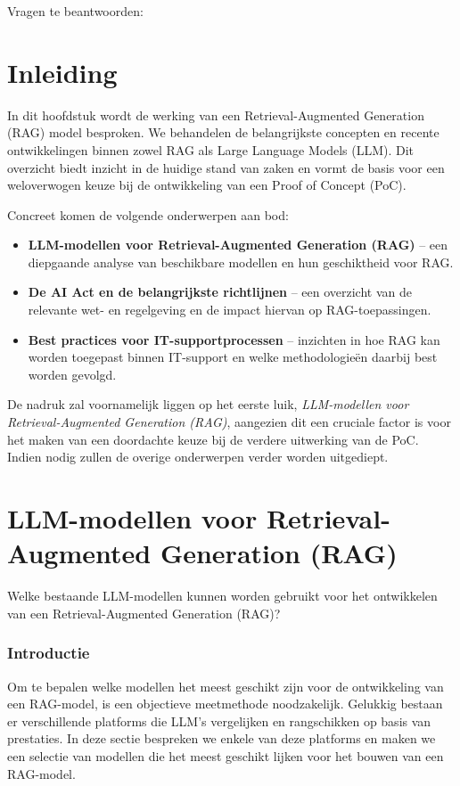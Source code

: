 Vragen te beantwoorden:

\section{Inleiding}
In dit hoofdstuk wordt de werking van een Retrieval-Augmented Generation (RAG) model besproken. We behandelen de belangrijkste concepten en recente ontwikkelingen binnen zowel RAG als Large Language Models (LLM). Dit overzicht biedt inzicht in de huidige stand van zaken en vormt de basis voor een weloverwogen keuze bij de ontwikkeling van een Proof of Concept (PoC).

Concreet komen de volgende onderwerpen aan bod:
\begin{itemize}
    \item \textbf{LLM-modellen voor Retrieval-Augmented Generation (RAG)} – een diepgaande analyse van beschikbare modellen en hun geschiktheid voor RAG.
    \item \textbf{De AI Act en de belangrijkste richtlijnen} – een overzicht van de relevante wet- en regelgeving en de impact hiervan op RAG-toepassingen.
    \item \textbf{Best practices voor IT-supportprocessen} – inzichten in hoe RAG kan worden toegepast binnen IT-support en welke methodologieën daarbij best worden gevolgd.
\end{itemize}

De nadruk zal voornamelijk liggen op het eerste luik, \textit{LLM-modellen voor Retrieval-Augmented Generation (RAG)}, aangezien dit een cruciale factor is voor het maken van een doordachte keuze bij de verdere uitwerking van de PoC. Indien nodig zullen de overige onderwerpen verder worden uitgediept.

\section{LLM-modellen voor Retrieval-Augmented Generation (RAG)}
Welke bestaande LLM-modellen kunnen worden gebruikt voor het ontwikkelen van een Retrieval-Augmented Generation (RAG)?

        \subsubsection{Introductie}
        Om te bepalen welke modellen het meest geschikt zijn voor de ontwikkeling van een RAG-model, is een objectieve meetmethode noodzakelijk. Gelukkig bestaan er verschillende platforms die LLM's vergelijken en rangschikken op basis van prestaties. In deze sectie bespreken we enkele van deze platforms en maken we een selectie van modellen die het meest geschikt lijken voor het bouwen van een RAG-model.
        
